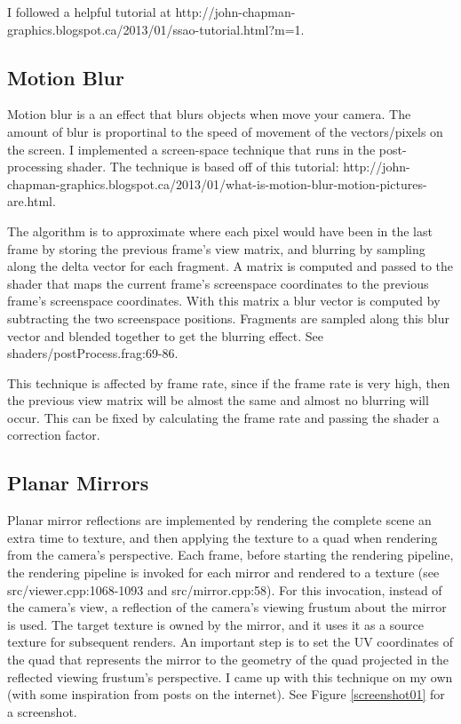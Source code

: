 \documentclass[oneside]{book}
\begin{document}
      I followed a helpful tutorial at http://john-chapman-graphics.blogspot.ca/2013/01/ssao-tutorial.html?m=1.


    \subsection{Motion Blur} \label{motion-blur}
      Motion blur is a an effect that blurs objects when move your camera. The amount of blur is proportinal to the speed of movement of the vectors/pixels on the screen.
      I implemented a screen-space technique that runs in the post-processing shader. The technique is based off of this tutorial: http://john-chapman-graphics.blogspot.ca/2013/01/what-is-motion-blur-motion-pictures-are.html.

      The algorithm is to approximate where each pixel would have been in the last frame by storing the previous frame's view matrix, and blurring by sampling along the delta vector for each fragment. A matrix is computed and passed to the shader that maps the current frame's screenspace coordinates to the previous frame's screenspace coordinates. With this matrix a blur vector is computed by subtracting the two screenspace positions. Fragments are sampled along this blur vector and blended together to get the blurring effect. See shaders/postProcess.frag:69-86.

      This technique is affected by frame rate, since if the frame rate is very high, then the previous view matrix will be almost the same and almost no blurring will occur. This can be fixed by calculating the frame rate and passing the shader a correction factor.


    \subsection{Planar Mirrors} \label{mirrors}
      Planar mirror reflections are implemented by rendering the complete scene an extra time to texture, and then applying the texture to a quad when rendering from the camera's perspective. Each frame, before starting the rendering pipeline, the rendering pipeline is invoked for each mirror and rendered to a texture (see src/viewer.cpp:1068-1093 and src/mirror.cpp:58). For this invocation, instead of the camera's view, a reflection of the camera's viewing frustum about the mirror is used. The target texture is owned by the mirror, and it uses it as a source texture for subsequent renders. An important step is to set the UV coordinates of the quad that represents the mirror to the geometry of the quad projected in the reflected viewing frustum's perspective. I came up with this technique on my own (with some inspiration from posts on the internet). See Figure \ref{screenshot01} for a screenshot.
\end{document}
